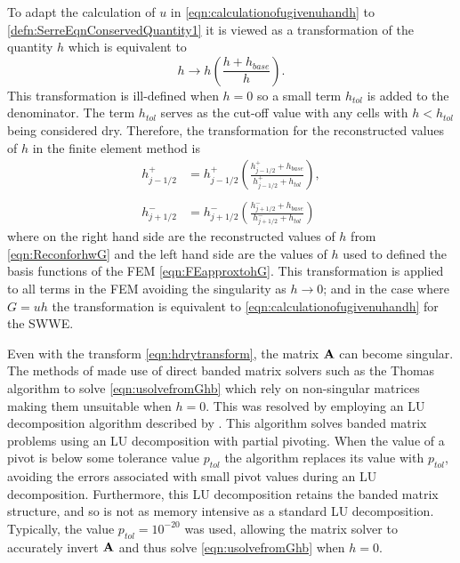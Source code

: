 To adapt the calculation of $u$ in \eqref{eqn:calculationofugivenuhandh} to \eqref{defn:SerreEqnConservedQuantity1} it is viewed as a transformation of the quantity $h$ which is equivalent to
\begin{equation}
h \rightarrow h \left( \frac{h + h_{base}}{h} \right).
\end{equation}
This transformation is ill-defined when $h = 0$ so a small term $h_{tol}$ is added to the denominator. The term $h_{tol}$ serves as the cut-off value with any cells with $h < h_{tol}$ being considered dry. Therefore, the transformation for the reconstructed values of $h$ in the finite element method is
\begin{subequations}
	\begin{align}
	h^+_{j-1/2} & = h^+_{j-1/2} \left(\frac{ h^+_{j-1/2}  + h_{base}}{h^+_{j-1/2} + h_{tol}}\right) , \\ \nonumber\\
	h^-_{j+1/2} & = h^-_{j+1/2} \left(\frac{ h^-_{j+1/2}  + h_{base}}{h^-_{j+1/2} + h_{tol}}\right)
	\end{align} 
	\label{eqn:hdrytransform}
\end{subequations}
where on the right hand side are the reconstructed values of $h$ from \eqref{eqn:ReconforhwG} and the left hand side are the values of $h$ used to defined the basis functions of the FEM \eqref{eqn:FEapproxtohG}. This transformation is applied to all terms in the FEM avoiding the singularity as $h \rightarrow 0$; and in the case where $G = uh$ the transformation is equivalent to \eqref{eqn:calculationofugivenuhandh} for the SWWE.

Even with the transform \eqref{eqn:hdrytransform}, the matrix $\mathbf{A}$ can become singular.
The methods of \citet{Zoppou-etal-2017} made use of direct banded matrix solvers such as the Thomas algorithm \cite{Conte-DeBoor-1980} to solve \eqref{eqn:usolvefromGhb} which rely on non-singular matrices making them unsuitable when $h = 0$. This was resolved by employing an LU decomposition algorithm described by \citet{NumRecC-1996}. This algorithm solves banded matrix problems using an LU decomposition with partial pivoting. When the value of a pivot is below some tolerance value $p_{tol}$ the algorithm replaces its value with $p_{tol}$, avoiding the errors associated with small pivot values during an LU decomposition. Furthermore, this LU decomposition retains the banded matrix structure, and so is not as memory intensive as a standard LU decomposition. Typically, the value $p_{tol} = 10^{-20}$ was used, allowing the matrix solver to accurately invert $\mathbf{A}$ and thus solve \eqref{eqn:usolvefromGhb} when $h = 0$. 

